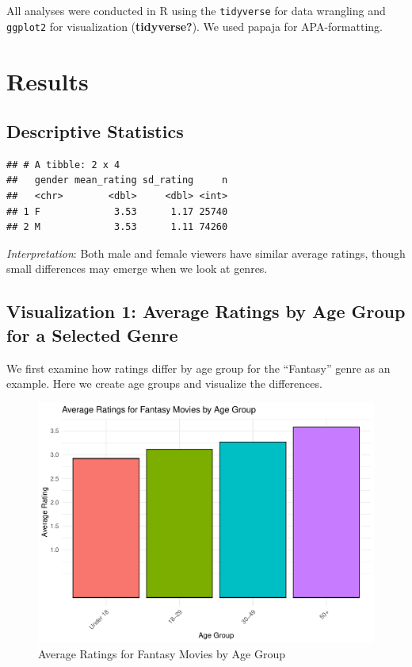 \documentclass[
  man]{apa6}
\begin{document}
All analyses were conducted in R using the \texttt{tidyverse} for data wrangling and \texttt{ggplot2} for visualization (\textbf{tidyverse?}). We used papaja for APA-formatting.

\section{Results}\label{results}

\subsection{Descriptive Statistics}\label{descriptive-statistics}

\begin{verbatim}
## # A tibble: 2 x 4
##   gender mean_rating sd_rating     n
##   <chr>        <dbl>     <dbl> <int>
## 1 F             3.53      1.17 25740
## 2 M             3.53      1.11 74260
\end{verbatim}

\emph{Interpretation}: Both male and female viewers have similar average ratings, though small differences may emerge when we look at genres.

\subsection{Visualization 1: Average Ratings by Age Group for a Selected Genre}\label{visualization-1-average-ratings-by-age-group-for-a-selected-genre}

We first examine how ratings differ by age group for the ``Fantasy'' genre as an example. Here we create age groups and visualize the differences.

\begin{figure}
\centering
\includegraphics{Project_files/figure-latex/age-groups-plot-1.pdf}
\caption{\label{fig:age-groups-plot}Average Ratings for Fantasy Movies by Age Group}
\end{figure}
\end{document}
